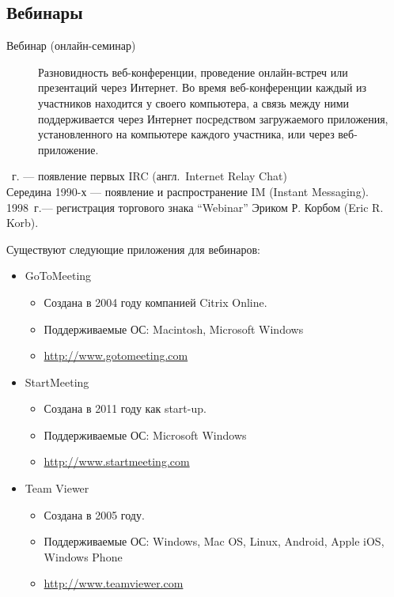 \subsection{Вебинары}

\begin{description}
    \item [Вебинар (онлайн-семинар)]
          Разновидность веб-конференции, проведение онлайн-встреч или презентаций через Интернет. Во время веб-конференции каждый из участников находится у своего компьютера, а связь между ними поддерживается через Интернет посредством загружаемого приложения, установленного на компьютере каждого участника, или через веб-приложение.
\end{description}

\par\medskip{}~г. --- появление первых IRC (англ.\ Internet Relay Chat) \\
Середина 1990-х --- появление и распространение IM (Instant Messaging). \\
1998~г.--- регистрация торгового знака \enquote{Webinar} Эриком Р. Корбом (Eric R. Korb).

Существуют следующие приложения для вебинаров:
\begin{itemize}
    \item GoToMeeting
          \begin{itemize}
              \item Создана в 2004 году компанией Citrix Online.
              \item Поддерживаемые ОС: Macintosh, Microsoft Windows
              \item \url{http://www.gotomeeting.com}
          \end{itemize}
    \item StartMeeting
          \begin{itemize}
              \item Создана в 2011 году как start-up.
              \item Поддерживаемые ОС: Microsoft Windows
              \item \url{http://www.startmeeting.com}
          \end{itemize}
    \item Team Viewer
          \begin{itemize}
              \item Создана в 2005 году.
              \item Поддерживаемые ОС: Windows, Mac OS, Linux, Android, Apple iOS, Windows Phone
              \item \url{http://www.teamviewer.com}
          \end{itemize}
\end{itemize}
